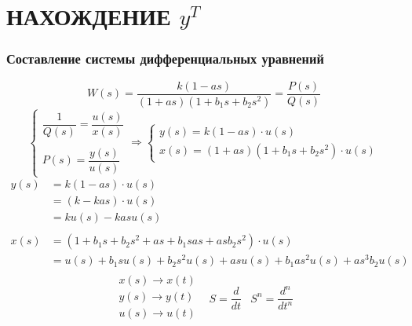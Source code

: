 \part{НАХОЖДЕНИЕ $y^T$}
    \section{Составление системы дифференциальных уравнений}
        $$
            W(s) = \frac{k(1-as)}{(1+as)(1+b_1s+b_2s^2)} = \frac{P(s)}{Q(s)}
        $$
        \vspace{1cm}
        $$
            \begin{cases}
                \dfrac{1}{Q(s)} = \dfrac{u(s)}{x(s)}
                \\\\
                P(s) = \dfrac{y(s)}{u(s)}
            \end{cases}
            \Rightarrow
            \begin{cases}
                y(s) = k(1-as) \cdot u(s)
                \\
                x(s) = (1+as)(1+b_1s+b_2s^2) \cdot u(s)
            \end{cases}
        $$
        \vspace{1cm}
        $$
            \begin{aligned}
                y(s)
                &= k(1-as) \cdot u(s) \\
                &= (k-kas) \cdot u(s) \\
                &= ku(s) - kasu(s)
                \\\\
                x(s)
                &= (1+b_1s + b_2s^2 + as + b_1sas + asb_2s^2) \cdot u(s) \\
                &= u(s) + b_1su(s) + b_2s^2u(s) + asu(s) + b_1as^2u(s) + as^3b_2u(s)
            \end{aligned}
        $$
        \vspace{1cm}
        $$
            \begin{matrix}
                \begin{matrix}
                    x(s) \to x(t) \\
                    y(s) \to y(t) \\
                    u(s) \to u(t) \\
                \end{matrix}
                &
                S = \dfrac{d}{dt}
                &
                S^n = \dfrac{d^n}{dt^n}
            \end{matrix}
        $$
